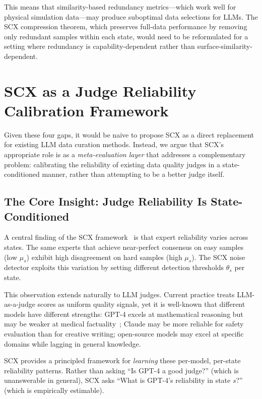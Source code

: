 \documentclass[11pt,twocolumn]{article}
\begin{document}
This means that similarity-based redundancy metrics---which work well for physical simulation data---may produce suboptimal data selections for LLMs. The SCX compression theorem, which preserves full-data performance by removing only redundant samples within each state, would need to be reformulated for a setting where redundancy is capability-dependent rather than surface-similarity-dependent.

\section{SCX as a Judge Reliability Calibration Framework}

Given these four gaps, it would be naive to propose SCX as a direct replacement for existing LLM data curation methods. Instead, we argue that SCX's appropriate role is as a \textit{meta-evaluation layer} that addresses a complementary problem: calibrating the reliability of existing data quality judges in a state-conditioned manner, rather than attempting to be a better judge itself.

\subsection{The Core Insight: Judge Reliability Is State-Conditioned}

A central finding of the SCX framework~\cite{scx2026} is that expert reliability varies across states. The same experts that achieve near-perfect consensus on easy samples (low $\mu_s$) exhibit high disagreement on hard samples (high $\mu_s$). The SCX noise detector exploits this variation by setting different detection thresholds $\theta_s$ per state.

This observation extends naturally to LLM judges. Current practice treats LLM-as-a-judge scores as uniform quality signals, yet it is well-known that different models have different strengths: GPT-4 excels at mathematical reasoning but may be weaker at medical factuality~\cite{singhal2023large}; Claude may be more reliable for safety evaluation than for creative writing; open-source models may excel at specific domains while lagging in general knowledge.

SCX provides a principled framework for \textit{learning} these per-model, per-state reliability patterns. Rather than asking ``Is GPT-4 a good judge?'' (which is unanswerable in general), SCX asks ``What is GPT-4's reliability in state $s$?'' (which is empirically estimable).
\end{document}
